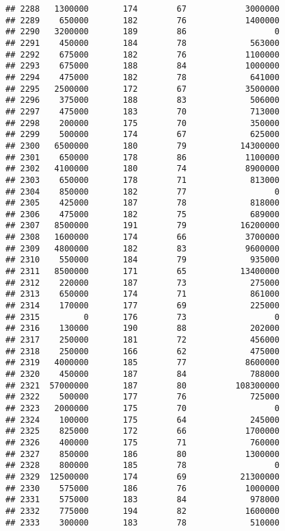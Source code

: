 \documentclass[
]{article}
\begin{document}
\begin{verbatim}
## 2288   1300000       174        67            3000000
## 2289    650000       182        76            1400000
## 2290   3200000       189        86                  0
## 2291    450000       184        78             563000
## 2292    675000       182        76            1100000
## 2293    675000       188        84            1000000
## 2294    475000       182        78             641000
## 2295   2500000       172        67            3500000
## 2296    375000       188        83             506000
## 2297    475000       183        70             713000
## 2298    200000       175        70             350000
## 2299    500000       174        67             625000
## 2300   6500000       180        79           14300000
## 2301    650000       178        86            1100000
## 2302   4100000       180        74            8900000
## 2303    650000       178        71             813000
## 2304    850000       182        77                  0
## 2305    425000       187        78             818000
## 2306    475000       182        75             689000
## 2307   8500000       191        79           16200000
## 2308   1600000       174        66            3700000
## 2309   4800000       182        83            9600000
## 2310    550000       184        79             935000
## 2311   8500000       171        65           13400000
## 2312    220000       187        73             275000
## 2313    650000       174        71             861000
## 2314    170000       177        69             225000
## 2315         0       176        73                  0
## 2316    130000       190        88             202000
## 2317    250000       181        72             456000
## 2318    250000       166        62             475000
## 2319   4000000       185        77            8600000
## 2320    450000       187        84             788000
## 2321  57000000       187        80          108300000
## 2322    500000       177        76             725000
## 2323   2000000       175        70                  0
## 2324    100000       175        64             245000
## 2325    825000       172        66            1700000
## 2326    400000       175        71             760000
## 2327    850000       186        80            1300000
## 2328    800000       185        78                  0
## 2329  12500000       174        69           21300000
## 2330    575000       186        76            1000000
## 2331    575000       183        84             978000
## 2332    775000       194        82            1600000
## 2333    300000       183        78             510000

\end{verbatim}
\end{document}
